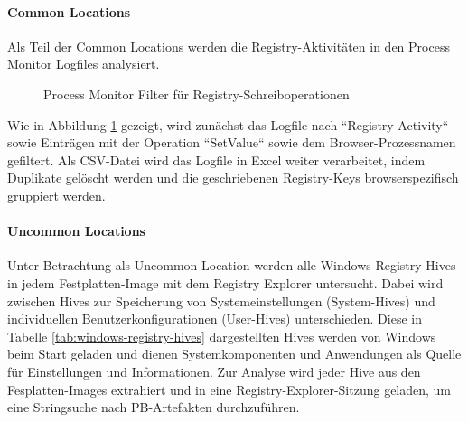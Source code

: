 \paragraph*{Common Locations}
Als Teil der Common Locations werden die Registry-Aktivitäten in den Process Monitor Logfiles analysiert.
\begin{figure}[h!]
	\centerline{}
	\caption{Process Monitor Filter für Registry-Schreiboperationen}
	\label{img:procmon-setvalue-filter}
\end{figure}
Wie in Abbildung \ref{img:procmon-setvalue-filter} gezeigt, wird zunächst das Logfile nach ``Registry Activity`` sowie Einträgen mit der Operation ``SetValue`` sowie dem Browser-Prozessnamen gefiltert.
Als CSV-Datei wird das Logfile in Excel weiter verarbeitet, indem Duplikate gelöscht werden und die geschriebenen Registry-Keys browserspezifisch gruppiert werden.
	
\paragraph*{Uncommon Locations}
Unter Betrachtung als Uncommon Location werden alle Windows Registry-Hives in jedem Festplatten-Image mit dem Registry Explorer untersucht.
Dabei wird zwischen Hives zur Speicherung von Systemeinstellungen (System-Hives) und individuellen Benutzerkonfigurationen (User-Hives) unterschieden. Diese in Tabelle \ref{tab:windows-registry-hives} dargestellten Hives werden von Windows beim Start geladen und dienen Systemkomponenten und Anwendungen als Quelle für Einstellungen und Informationen. \cite{Haircutfish.04.11.2022}
Zur Analyse wird jeder Hive aus den Fesplatten-Images extrahiert und in eine Registry-Explorer-Sitzung geladen, um eine Stringsuche nach PB-Artefakten durchzuführen.

